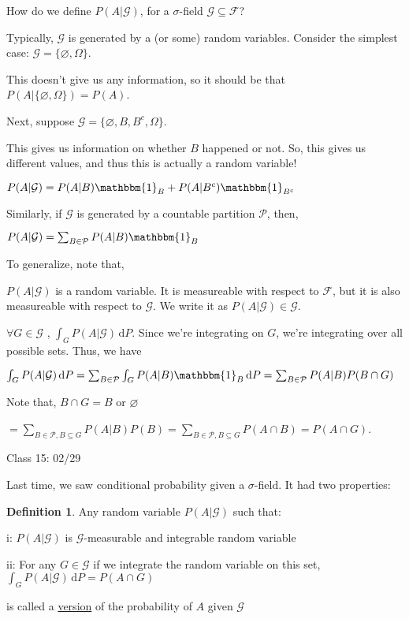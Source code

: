 \documentclass{article}
\theoremstyle{definition}
\newtheorem{definition}{Definition}
\begin{document}
How do we define \(P(A|\mathcal{G})\), for a \(\sigma\)-field \(\mathcal{G} \subseteq \mathcal{F}\)?

Typically, \(\mathcal{G}\) is generated by a (or some) random variables. Consider the simplest case: \(\mathcal{G} = \{ \varnothing, \Omega \} \).

This doesn't give us any information, so it should be that \(P(A|\{ \varnothing , \Omega \} ) = P(A)\).

Next, suppose \(\mathcal{G} = \{ \varnothing , B, B^c, \Omega \} \).

This gives us information on whether \(B\) happened or not. So, this gives us different values, and thus this is actually a random variable!

\(P(A|\mathcal{G}) = P(A|B)\mathbbm{1}_{B} + P(A|B^c)\mathbbm{1}_{B^c} \) 

Similarly, if \(\mathcal{G}\) is generated by a countable partition \(\mathcal{P} \), then,

\(P(A|\mathcal{G}) = \sum_{B\in \mathcal{P}}^{} P(A|B)\mathbbm{1}_{B}\) 

To generalize, note that,

\(P(A|\mathcal{G})\) is a random variable. It is measureable with respect to \(\mathcal{F}\), but it is also measureable with respect to \(\mathcal{G}\). We write it as \(P(A|\mathcal{G})\in \mathcal{G}\).

\(\forall G\in \mathcal{G}\) , \(\int_G P(A|\mathcal{G})\,\mathrm{d} P\). Since we're integrating on \(G\), we're integrating over all possible sets. Thus, we have

\(\int_G P(A|\mathcal{G})\,\mathrm{d}P = \sum_{B\in \mathcal{P}}^{} \int_G P(A|B)\mathbbm{1}_{B} \,\mathrm{d} P = \sum_{B\in \mathcal{P}}^{} P(A | B)P(B\cap G) \) 

Note that, \(B\cap G=B\) or \(\varnothing\) 

\(=\sum_{B\in \mathcal{P} , B \subseteq G}^{} P(A|B)P(B) = \sum_{B\in \mathcal{P} ,B \subseteq G}^{} P(A\cap B)=P(A\cap G)\). 

\hrulefill

Class 15: 02/29

Last time, we saw conditional probability given a \(\sigma \)-field. It had two properties:

\begin{definition}
    
    Any random variable \(P(A|\mathcal{G})\) such that:

    i: \(P(A|\mathcal{G})\) is \(\mathcal{G}\)-measurable and integrable random variable

    ii: For any \(G\in \mathcal{G}\) if we integrate the random variable on this set, \(\int_{G}^{} P(A | \mathcal{G}) \,\mathrm{d}P = P(A\cap G)\) 

    is called a \underline{version} of the probability of \(A\) given \(\mathcal{G}\)

\end{definition}
\end{document}
